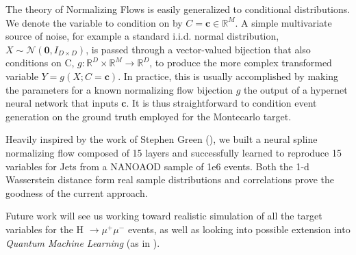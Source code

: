 \documentclass{scrartcl} %
\begin{document}
The theory of Normalizing Flows is easily generalized to conditional distributions. We denote the variable to condition on by $C=\mathbf{c}\in\mathbb{R}^M$. A simple multivariate source of noise, for example a standard i.i.d. normal distribution, $X\sim\mathcal{N}(\mathbf{0},I_{D\times D})$, is passed through a vector-valued bijection that also conditions on C, $g:\mathbb{R}^D\times\mathbb{R}^M\rightarrow\mathbb{R}^D$, to produce the more complex transformed variable $Y=g(X;C=\mathbf{c})$. In practice, this is usually accomplished by making the parameters for a known normalizing flow bijection $g$ the output of a hypernet neural network that inputs $\mathbf{c}$. It is thus straightforward to condition event generation on the ground truth employed for the Montecarlo target.

Heavily inspired by the work of Stephen Green (\cite{green2020complete}), we built a  neural spline normalizing flow composed of 15 layers and successfully learned to reproduce 15 variables for Jets from a NANOAOD sample of 1e6 events. Both the 1-d Wasserstein distance form real sample distributions and correlations prove the goodness of the current approach.

Future work will see us working toward realistic simulation of all the target variables for the  H $\xrightarrow{} \mu^+ \mu^-$ events, as well as looking into possible extension into \emph{Quantum Machine Learning} (as in \cite{chang2021quantum}).

	
	
\end{document}
